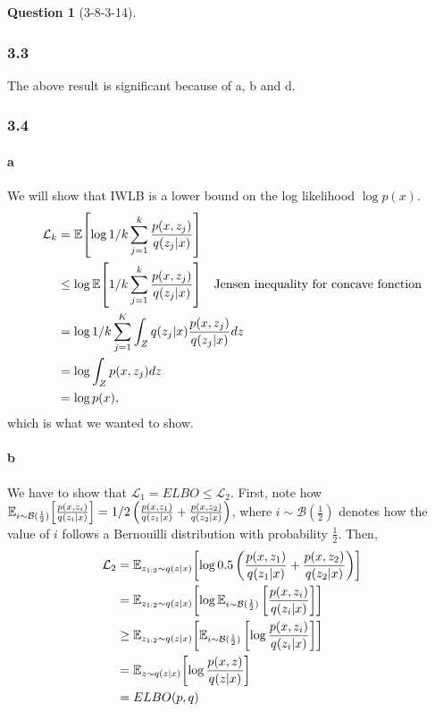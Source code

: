 \documentclass[12pt]{article}
\theoremstyle{definition}
\newtheorem{exercise}{Question}%
\begin{document}
\begin{exercise}[3-8-3-14]
{  \subsubsection*{3.3}
  The above result is significant because of a, b and d.
  \subsubsection*{3.4}
  \paragraph{a}
  We will show that IWLB is a lower bound on the log likelihood $\log p(x)$.
  \begin{align*}
    \mathcal{L}_{k} &= \mathbb{E}{\left[ \log 1/k \sum_{j =  1}^{k} \frac{p(x, z_{j})}{q(z_{j}|x)} \right]}\\
        & \leq  \log \mathbb{E}{\left[  1/k \sum_{j =  1}^{k} \frac{p(x, z_{j})}{q(z_{j}|x)} \right]} \quad \text{Jensen
          inequality for concave fonction}\\
        & = \log 1/k \sum_{j = 1}^{K} \int_{Z} q(z_{j}|x) \frac{p(x, z_{j})}{q(z_{j}|x)} dz\\
        & = \log \int_{Z} p(x,z_{j}) dz \\
        & = \log p(x),
  \end{align*}
  which is what we wanted to show.
  \paragraph{b}
  We have to show that $\mathcal{L}_{1} = ELBO \leq \mathcal{L}_{2}$. First, note how
  $\mathbb{E}_{i\sim \mathcal{B}(\frac{1}{2})}{\left[ \frac{p(x,z_{i})}{q(z_{i}|x)} \right]} = 1/2 \left( \frac{p(x,z_{1})}{q(z_{1}|x)}+ \frac{p(x,z_{2})}{q(z_{2}|x)} \right)$,
  where $i \sim \mathcal{B}(\frac{1}{2})$ denotes how the value of $i$ follows a Bernouilli
  distribution with probability $\frac{1}{2}$. Then, %
  \begin{align*}
    \mathcal{L}_{2} &= \mathbb{E}_{z_{1:2} \sim q(z | x)}{\left[ \log 0.5 \left( \frac{p(x, z_{1})}{q(z_{1}|x)} + \frac{p(x, z_{2})}{q(z_{2}|x)} \right) \right]}\\
                    &= \mathbb{E}_{z_{1:2} \sim q(z | x)}{\left[ \log  \mathbb{E}_{i\sim \mathcal{B}(\frac{1}{2})}\,{\left[ \frac{p(x, z_{i})}{q(z_{i}|x)} \right]} \right]}\\
                    &\geq \mathbb{E}_{z_{1:2} \sim q(z | x)}{\left[   \mathbb{E}_{i\sim \mathcal{B}(\frac{1}{2})}\,{\left[ \log \frac{p(x, z_{i})}{q(z_{i}|x)} \right]} \right]}\\
                    &=  \mathbb{E}_{z \sim q(z | x)}{\left[ \log \frac{p(x,z)}{q(z|x)} \right]}\\
                    &= ELBO(p,q)
  \end{align*}
}
\end{exercise}
\end{document}
